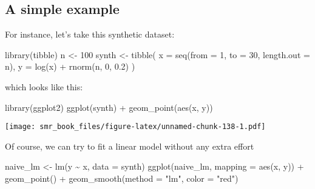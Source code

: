 \documentclass[
  oneside]{book}
\newenvironment{Shaded}{\begin{snugshade}}{\end{snugshade}}
\newcommand{\AttributeTok}[1]{\textcolor[rgb]{0.77,0.63,0.00}{#1}}
\newcommand{\DecValTok}[1]{\textcolor[rgb]{0.00,0.00,0.81}{#1}}
\newcommand{\FloatTok}[1]{\textcolor[rgb]{0.00,0.00,0.81}{#1}}
\newcommand{\FunctionTok}[1]{\textcolor[rgb]{0.00,0.00,0.00}{#1}}
\newcommand{\NormalTok}[1]{#1}
\newcommand{\OtherTok}[1]{\textcolor[rgb]{0.56,0.35,0.01}{#1}}
\newcommand{\SpecialCharTok}[1]{\textcolor[rgb]{0.00,0.00,0.00}{#1}}
\newcommand{\StringTok}[1]{\textcolor[rgb]{0.31,0.60,0.02}{#1}}
\begin{document}
\hypertarget{a-simple-example}{%
\subsection{A simple example}\label{a-simple-example}}

For instance, let's take this synthetic dataset:

\begin{Shaded}
\begin{Highlighting}[]
\FunctionTok{library}\NormalTok{(tibble)}
\NormalTok{n }\OtherTok{\textless{}{-}} \DecValTok{100}
\NormalTok{synth }\OtherTok{\textless{}{-}} \FunctionTok{tibble}\NormalTok{(}
  \AttributeTok{x =} \FunctionTok{seq}\NormalTok{(}\AttributeTok{from =} \DecValTok{1}\NormalTok{, }\AttributeTok{to =} \DecValTok{30}\NormalTok{, }\AttributeTok{length.out =}\NormalTok{ n),}
  \AttributeTok{y =} \FunctionTok{log}\NormalTok{(x) }\SpecialCharTok{+} \FunctionTok{rnorm}\NormalTok{(n, }\DecValTok{0}\NormalTok{, }\FloatTok{0.2}\NormalTok{)}
\NormalTok{)}
\end{Highlighting}
\end{Shaded}

which looks like this:

\begin{Shaded}
\begin{Highlighting}[]
\FunctionTok{library}\NormalTok{(ggplot2)}
\FunctionTok{ggplot}\NormalTok{(synth) }\SpecialCharTok{+}
  \FunctionTok{geom\_point}\NormalTok{(}\FunctionTok{aes}\NormalTok{(x, y))}
\end{Highlighting}
\end{Shaded}

\texttt{[image: smr\_book\_files/figure-latex/unnamed-chunk-138-1.pdf]}

Of course, we can try to fit a linear model without any
extra effort

\begin{Shaded}
\begin{Highlighting}[]
\NormalTok{naive\_lm }\OtherTok{\textless{}{-}} \FunctionTok{lm}\NormalTok{(y }\SpecialCharTok{\textasciitilde{}}\NormalTok{ x, }\AttributeTok{data =}\NormalTok{ synth)}
\FunctionTok{ggplot}\NormalTok{(naive\_lm, }\AttributeTok{mapping =} \FunctionTok{aes}\NormalTok{(x, y)) }\SpecialCharTok{+}
  \FunctionTok{geom\_point}\NormalTok{() }\SpecialCharTok{+}
  \FunctionTok{geom\_smooth}\NormalTok{(}\AttributeTok{method =} \StringTok{"lm"}\NormalTok{, }\AttributeTok{color =} \StringTok{"red"}\NormalTok{)}
\end{Highlighting}
\end{Shaded}
\end{document}
